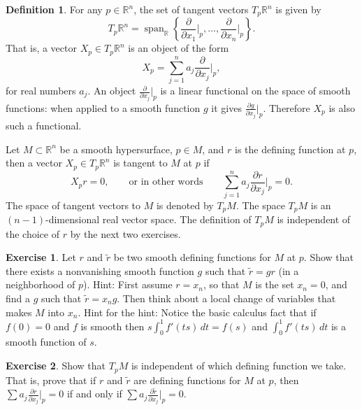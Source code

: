 \documentclass[12pt,openany]{book}
\newcommand{\R}{{\mathbb{R}}}
\theoremstyle{plain}
\theoremstyle{remark}
\theoremstyle{definition}
\newtheorem{defn}[thm]{Definition}
\newenvironment{exbox}{%
    \def\FrameCommand{\vrule width 1pt \relax\hspace {10pt}}%
    \MakeFramed {\advance \hsize -\width \FrameRestore }%
}{%
    \endMakeFramed
}
\theoremstyle{exercise}
\newtheorem{exercise}{Exercise}[section]
\theoremstyle{example}
\begin{document}
\begin{defn}
For any $p \in \R^n$, the set of tangent vectors $T_p \R^n$ is given by
%
\begin{equation*}
T_p \R^n = \operatorname{span}_{\R} \left\{
\frac{\partial}{\partial x_1}\Big|_p,
\ldots,
\frac{\partial}{\partial x_n}\Big|_p \right\} .
\end{equation*}
That is, a vector $X_p \in T_p \R^n$ is an object of the form
\begin{equation*}
X_p = \sum_{j=1}^n a_j 
\frac{\partial}{\partial x_j}\Big|_p ,
\end{equation*}
for real numbers $a_j$.
%
An object $\frac{\partial}{\partial x_j}\Big|_p$ is a linear functional
on the space of smooth functions:
when applied to a smooth function $g$ it gives
$\frac{\partial g}{\partial x_j} \Big|_p$.  Therefore $X_p$ is also such a
functional.

Let $M \subset \R^n$ be a smooth hypersurface, %
$p \in M$, and $r$ is the defining function at $p$,
then a vector $X_p \in T_p \R^n$ is tangent 
to $M$ at $p$ if
\begin{equation*}
X_p r = 0, \qquad \text{or in other words} \qquad
\sum_{j=1}^n a_j \frac{\partial r}{\partial x_j} \Big|_p = 0 .
\end{equation*}
%
The space of tangent vectors to $M$ is denoted by $T_p M$.  The
space $T_pM$ is an $(n-1)$-dimensional real vector space.  
The definition of $T_pM$ is independent of the choice of $r$ by the next two
exercises.

\begin{exbox}
\begin{exercise}
Let $r$ and $\tilde{r}$ be two smooth defining functions for $M$ at $p$.
Show that there exists a nonvanishing smooth function $g$ such that
$\tilde{r} = g r$ (in a neighborhood of $p$).
Hint: First assume $r=x_n$, so that $M$ is the set $x_n = 0$,
and find a $g$ such that $\tilde{r} = x_n g$.  Then think
about a local change of variables that makes $M$ into $x_n$.  Hint for the
hint: Notice
the basic calculus fact that if $f(0) = 0$ and $f$ is smooth then
$s \int_0^1 f'(ts) \,dt = f(s)$
and $\int_0^1 f'(ts) \,dt$ is a smooth function of $s$.
\end{exercise}

\begin{exercise}
Show that $T_pM$ is independent of which defining function we take.  That
is,
prove that if $r$ and $\tilde{r}$ are defining functions for $M$ at $p$, then
$\sum a_j \frac{\partial r}{\partial x_j} \Big|_p = 0$
if and only if
$\sum a_j \frac{\partial \tilde{r}}{\partial x_j} \Big|_p = 0$.
\end{exercise}
\end{exbox}


\end{defn}
\end{document}
